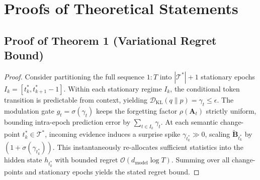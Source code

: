 \appendix
\section{Proofs of Theoretical Statements}
\label{app:proofs}

\subsection{Proof of Theorem 1 (Variational Regret Bound)}
\begin{proof}
Consider partitioning the full sequence $1:T$ into $|\mathcal{T}^*| + 1$ stationary epochs $I_k = [t_k^*, t_{k+1}^*-1]$.
Within each stationary regime $I_k$, the conditional token transition is predictable from context, yielding $\mathcal{D}_{\mathrm{KL}}(q \parallel p) = \gamma_t \le \epsilon$. The modulation gate $g_t = \sigma(\gamma_t)$ keeps the forgetting factor $\rho(\mathbf{A}_t)$ strictly uniform, bounding intra-epoch prediction error by $\sum_{t \in I_k} \gamma_t$.
At each semantic change-point $t_k^* \in \mathcal{T}^*$, incoming evidence induces a surprise spike $\gamma_{t_k^*} \gg 0$, scaling $\tilde{\mathbf{B}}_{t_k^*}$ by $(1 + \sigma(\gamma_{t_k^*}))$. This instantaneously re-allocates sufficient statistics into the hidden state $h_{t_k^*}$ with bounded regret $\mathcal{O}(d_{\mathrm{model}} \log T)$. Summing over all change-points and stationary epochs yields the stated regret bound.
\end{proof}

